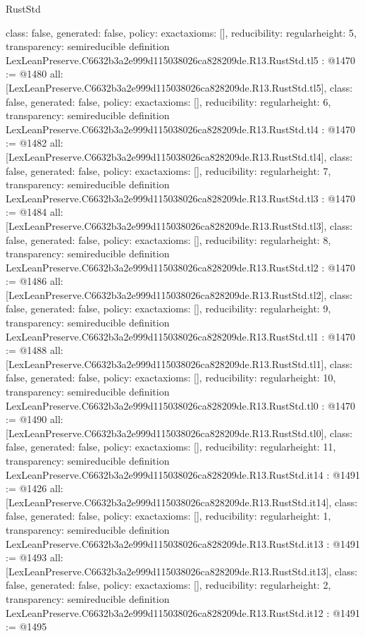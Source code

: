 \begin{lexlean}{RustStd}
\begin{coremodule}
{  class: false,
  generated: false,
  policy: exact{axioms: []},
  reducibility: regular{height: 5},
  transparency: semireducible
}
definition LexLeanPreserve.C6632b3a2e999d115038026ca828209de.R13.RustStd.tl5 : @1470 := @1480 {
  all: [LexLeanPreserve.C6632b3a2e999d115038026ca828209de.R13.RustStd.tl5],
  class: false,
  generated: false,
  policy: exact{axioms: []},
  reducibility: regular{height: 6},
  transparency: semireducible
}
definition LexLeanPreserve.C6632b3a2e999d115038026ca828209de.R13.RustStd.tl4 : @1470 := @1482 {
  all: [LexLeanPreserve.C6632b3a2e999d115038026ca828209de.R13.RustStd.tl4],
  class: false,
  generated: false,
  policy: exact{axioms: []},
  reducibility: regular{height: 7},
  transparency: semireducible
}
definition LexLeanPreserve.C6632b3a2e999d115038026ca828209de.R13.RustStd.tl3 : @1470 := @1484 {
  all: [LexLeanPreserve.C6632b3a2e999d115038026ca828209de.R13.RustStd.tl3],
  class: false,
  generated: false,
  policy: exact{axioms: []},
  reducibility: regular{height: 8},
  transparency: semireducible
}
definition LexLeanPreserve.C6632b3a2e999d115038026ca828209de.R13.RustStd.tl2 : @1470 := @1486 {
  all: [LexLeanPreserve.C6632b3a2e999d115038026ca828209de.R13.RustStd.tl2],
  class: false,
  generated: false,
  policy: exact{axioms: []},
  reducibility: regular{height: 9},
  transparency: semireducible
}
definition LexLeanPreserve.C6632b3a2e999d115038026ca828209de.R13.RustStd.tl1 : @1470 := @1488 {
  all: [LexLeanPreserve.C6632b3a2e999d115038026ca828209de.R13.RustStd.tl1],
  class: false,
  generated: false,
  policy: exact{axioms: []},
  reducibility: regular{height: 10},
  transparency: semireducible
}
definition LexLeanPreserve.C6632b3a2e999d115038026ca828209de.R13.RustStd.tl0 : @1470 := @1490 {
  all: [LexLeanPreserve.C6632b3a2e999d115038026ca828209de.R13.RustStd.tl0],
  class: false,
  generated: false,
  policy: exact{axioms: []},
  reducibility: regular{height: 11},
  transparency: semireducible
}
definition LexLeanPreserve.C6632b3a2e999d115038026ca828209de.R13.RustStd.it14 : @1491 := @1426 {
  all: [LexLeanPreserve.C6632b3a2e999d115038026ca828209de.R13.RustStd.it14],
  class: false,
  generated: false,
  policy: exact{axioms: []},
  reducibility: regular{height: 1},
  transparency: semireducible
}
definition LexLeanPreserve.C6632b3a2e999d115038026ca828209de.R13.RustStd.it13 : @1491 := @1493 {
  all: [LexLeanPreserve.C6632b3a2e999d115038026ca828209de.R13.RustStd.it13],
  class: false,
  generated: false,
  policy: exact{axioms: []},
  reducibility: regular{height: 2},
  transparency: semireducible
}
definition LexLeanPreserve.C6632b3a2e999d115038026ca828209de.R13.RustStd.it12 : @1491 := @1495 {
}
\end{coremodule}
\end{lexlean}
